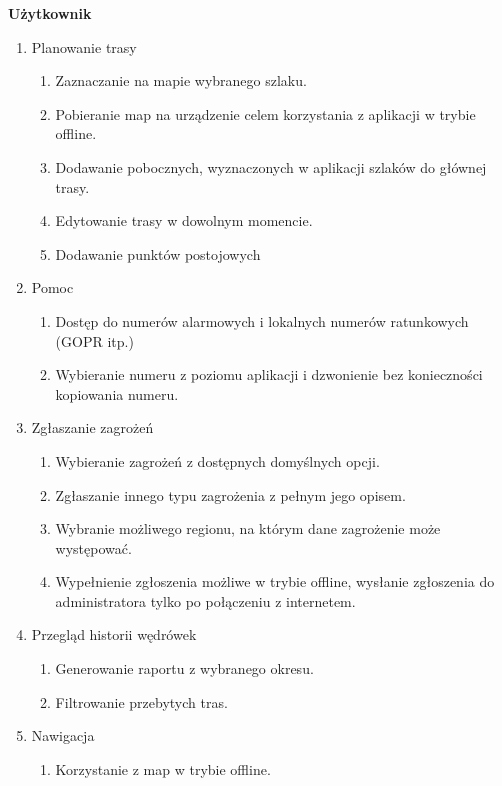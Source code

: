     \textbf{Użytkownik}
    \begin{enumerate}
        \item Planowanie trasy
        \begin{enumerate}
            \item Zaznaczanie na mapie wybranego szlaku.
            \item Pobieranie map na urządzenie celem korzystania z aplikacji w trybie offline.
            \item Dodawanie pobocznych, wyznaczonych w aplikacji szlaków do głównej trasy.
            \item Edytowanie trasy w dowolnym momencie.
            \item Dodawanie punktów postojowych
        \end{enumerate}
        \item Pomoc
        \begin{enumerate}
            \item Dostęp do numerów alarmowych i lokalnych numerów ratunkowych (GOPR itp.)
            \item Wybieranie numeru z poziomu aplikacji i dzwonienie bez konieczności kopiowania numeru.
        \end{enumerate}
        \item Zgłaszanie zagrożeń
        \begin{enumerate}
            \item Wybieranie zagrożeń z dostępnych domyślnych opcji.
            \item Zgłaszanie innego typu zagrożenia z pełnym jego opisem.
            \item Wybranie możliwego regionu, na którym dane zagrożenie może występować.
            \item Wypełnienie zgłoszenia możliwe w trybie offline, wysłanie zgłoszenia do administratora tylko po połączeniu z internetem.
        \end{enumerate}
        \item Przegląd historii wędrówek
        \begin{enumerate}
            \item Generowanie raportu z wybranego okresu.
            \item Filtrowanie przebytych tras.
        \end{enumerate}
        \item Nawigacja
        \begin{enumerate}
            \item Korzystanie z map w trybie offline.

\end{enumerate}
\end{enumerate}
